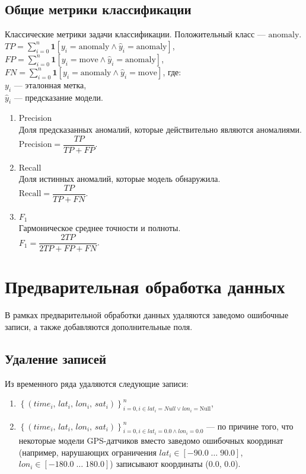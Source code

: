 \documentclass[a4paper,12pt]{report}
\begin{document}
	\subsection*{Общие метрики классификации}
	Классические метрики задачи классификации. Положительный класс --- $\mathrm{anomaly}$.\\
	$TP=\sum_{i=0}^{n}\mathbf{1}[y_i=\mathrm{anomaly}\land\hat{y}_i=\mathrm{anomaly}]$, \\
	$FP=\sum_{i=0}^{n}\mathbf{1}[y_i=\mathrm{move}\land\hat{y}_i=\mathrm{anomaly}]$, \\
	$FN=\sum_{i=0}^{n}\mathbf{1}[y_i=\mathrm{anomaly}\land\hat{y}_i=\mathrm{move}]$, где:\\
	$y_i$ --- эталонная метка, \\
	$\hat{y}_i$ --- предсказание модели.
	\begin{enumerate}
		\item Precision\\
		Доля предсказанных аномалий, которые действительно являются аномалиями.\\
		$\mathrm{Precision}=\dfrac{TP}{TP+FP}$.
		\item Recall\\
		Доля истинных аномалий, которые модель обнаружила.\\
		$\mathrm{Recall}=\dfrac{TP}{TP+FN}$.
		\item $F_1$\\
		Гармоническое среднее точности и полноты.\\
		$F_1=\dfrac{2TP}{2TP+FP+FN}$.
	\end{enumerate}


	\section{Предварительная обработка данных}
	В рамках предварительной обработки данных удаляются заведомо ошибочные записи, а также добавляются дополнительные поля.

	\subsection*{Удаление записей}
	Из временного ряда удаляются следующие записи:
	\begin{enumerate}
		\item $\left\{\left(\mathit{time}_i,\, \mathit{lat}_i,\, \mathit{lon}_i,\, \mathit{sat}_i\right) \right\}_{i=0, i \in {lat_i = Null \lor lon_i = \mathrm{Null}}}^{n}$,
		\item $\left\{\left(\mathit{time}_i,\, \mathit{lat}_i,\, \mathit{lon}_i,\, \mathit{sat}_i\right) \right\}_{i=0, i \in {lat_i = 0.0 \land lon_i = 0.0}}^{n}$ --- по причине того, что некоторые модели GPS-датчиков вместо заведомо ошибочных координат (например, нарушающих ограничения $lat_i \in [-90.0 \; \ldots \; 90.0]$, $lon_i \in [-180.0 \; \ldots \; 180.0]$) записывают координаты (0.0, 0.0).
	\end{enumerate}
\end{document}
